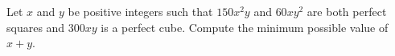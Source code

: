 Let $x$ and $y$ be positive integers such that $150x^2y$ and $60xy^2$ are both perfect squares and $300xy$ is a perfect cube. Compute the minimum possible value of $x + y$.
